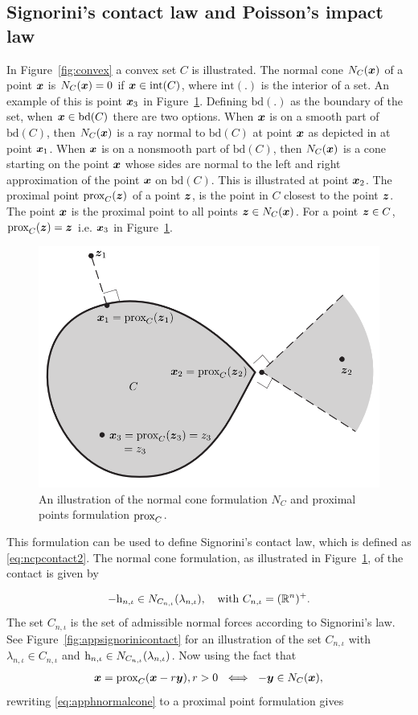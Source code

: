 \documentclass[../DC2019003Bouma.tex]{subfiles}
\begin{document}
\subsection{Signorini's contact law and Poisson's impact law}
In Figure~\ref{fig:convex} a convex set $C$ is illustrated. The normal cone $N_C({\boldsymbol{x}})$ of a point ${\boldsymbol{x}}$ is $N_C({\boldsymbol{x}})=0$ if ${\boldsymbol{x}}\in \text{int}(C)$, where $\text{int}(.)$ is the interior of a set. An example of this is point ${\boldsymbol{x}}_3$ in Figure~\ref{fig:appconvex}. Defining $\text{bd}(.)$ as the boundary of the set, when ${\boldsymbol{x}}\in \text{bd}(C)$ there are two options. When ${\boldsymbol{x}}$ is on a smooth part of $\text{bd}(C)$, then $N_C({\boldsymbol{x}})$ is a ray normal to $\text{bd}(C)$ at point ${\boldsymbol{x}}$ as depicted in at point ${\boldsymbol{x}}_1$. When ${\boldsymbol{x}}$ is on a nonsmooth part of $\text{bd}(C)$, then $N_C({\boldsymbol{x}})$ is a cone starting on the point ${\boldsymbol{x}}$ whose sides are normal to the left and right approximation of the point ${\boldsymbol{x}}$ on $\text{bd}(C)$. This is illustrated at point ${\boldsymbol{x}}_2$. The proximal point $\operatorname{\text{prox}}_C({\boldsymbol{z}})$ of a point ${\boldsymbol{z}}$, is the point in $C$ closest to the point ${\boldsymbol{z}}$. The point ${\boldsymbol{x}}$ is the proximal point to all points  ${\boldsymbol{z}}\in N_C({\boldsymbol{x}})$. For a point ${\boldsymbol{z}}\in C$, $\operatorname{\text{prox}}_C({\boldsymbol{z}}) = {\boldsymbol{z}}$ i.e. ${\boldsymbol{x}}_3$ in Figure~\ref{fig:appconvex}.

\begin{figure}[bt!]
\centering
\includegraphics[width=.6\textwidth]{convex.PNG}\caption{An illustration of the normal cone formulation $N_{C}$ and proximal points formulation $\operatorname{\text{prox}}_C$.}\label{fig:appconvex}
\end{figure}

This formulation can be used to define Signorini's contact law, which is defined as \eqref{eq:ncpcontact2}. The normal cone formulation, as illustrated in Figure~\ref{fig:appconvex}, of the contact is given by

\begin{align}
-\mathrm{h}_{n,\iota} \in N_{C_{n,\iota}}(\lambda_{n,\iota}),\quad \text{with }C_{n,\iota} = (\mathbb{R}^n)^+.\label{eq:apphnormalcone}
\end{align}
The set $C_{n,\iota}$ is the set of admissible normal forces according to Signorini's law. See Figure~\ref{fig:appsignorinicontact} for an illustration of the set $C_{n,\iota}$ with $\lambda_{n,\iota}\in C_{n,\iota}$ and $\mathrm{h}_{n,\iota} \in N_{C_{n,\iota}}(\lambda_{n,\iota})$. Now using the fact that
\begin{align}
{\boldsymbol{x}} = \operatorname{\text{prox}}_C({\boldsymbol{x}} -r{\boldsymbol{y}}), r > 0\ \iff\ -{\boldsymbol{y}}\in N_C({\boldsymbol{x}}),
\end{align}
rewriting \eqref{eq:apphnormalcone} to a proximal point formulation gives 
\end{document}
